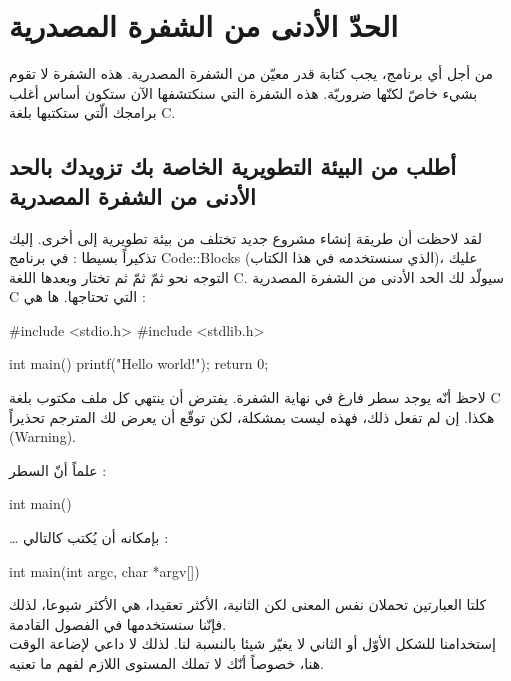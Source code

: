 \section{الحدّ الأدنى من الشفرة المصدرية}

من أجل أي برنامج، يجب كتابة قدر معيّن من الشفرة المصدرية. هذه الشفرة لا تقوم بشيء خاصّ لكنّها ضروريّة. هذه الشفرة التي سنكتشفها الآن ستكون أساس أغلب برامجك الّتي ستكتبها بلغة \textenglish{C}.

\subsection{أطلب من البيئة التطويرية الخاصة بك تزويدك بالحد الأدنى من الشفرة المصدرية}

لقد لاحظت أن طريقة إنشاء مشروع جديد تختلف من بيئة تطويرية إلى أخرى. إليك تذكيراً بسيطا : في برنامج
\textenglish{Code::Blocks}
 (الذي سنستخدمه في هذا الكتاب)، عليك التوجه نحو
 ثمّ
 ثمّ
 ثم تختار
 وبعدها اللغة
\textenglish{C}.
سيولّد لك الحد الأدنى من الشفرة المصدرية
 \textenglish{C}
 التي تحتاجها. ها هي :

\begin{Csource}
#include <stdio.h>
#include <stdlib.h>

int main()
{
    printf("Hello world!\n");
    return 0;
}

\end{Csource}

\begin{information}
لاحظ أنّه يوجد سطر فارغ في نهاية الشفرة. يفترض أن ينتهي كل ملف مكتوب بلغة
\textenglish{C}
هكذا. إن لم تفعل ذلك، فهذه ليست بمشكلة، لكن توقّع أن يعرض لك المترجم تحذيراً
(\textenglish{Warning}).
\end{information}

علماً أنّ السطر :
\begin{Csource}
int main()
\end{Csource}
\dots
بإمكانه أن يُكتب كالتالي :

\begin{Csource}
int main(int argc, char *argv[])
\end{Csource}

كلتا العبارتين تحملان نفس المعنى لكن الثانية، الأكثر تعقيدا، هي الأكثر شيوعا، لذلك فإنّنا سنستخدمها في الفصول القادمة.\\
إستخدامنا للشكل الأوّل أو الثاني لا يغيّر شيئا بالنسبة لنا. لذلك لا داعي لإضاعة الوقت هنا، خصوصاً أنّك لا تملك المستوى اللازم لفهم ما تعنيه.

